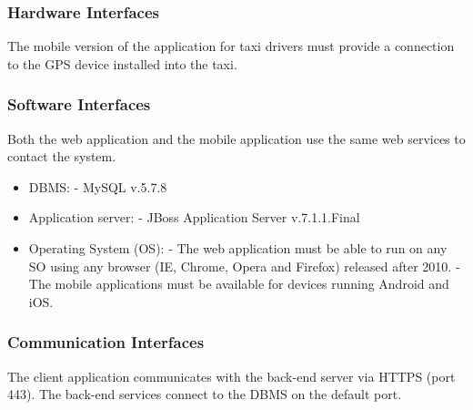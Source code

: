 \subsubsection{Hardware Interfaces}
	The mobile version of the application for taxi drivers must provide a connection to the GPS device installed into the taxi.
	
\subsubsection{Software Interfaces}
	Both the web application and the mobile application use the same web services to contact the system.
	\begin{itemize}
		\item DBMS: \newline
		- MySQL v.5.7.8
		\item Application server: \newline
		- JBoss Application Server v.7.1.1.Final
		\item Operating System (OS): \newline
		- The web application must be able to run on any SO using any browser (IE, Chrome, Opera and Firefox) released after 2010. \newline
		- The mobile applications must be available for devices running Android and iOS.
	\end{itemize}
	
\subsubsection{Communication Interfaces}
	The client application communicates with the back-end server via HTTPS (port 443).
	The back-end services connect to the DBMS on the default port.